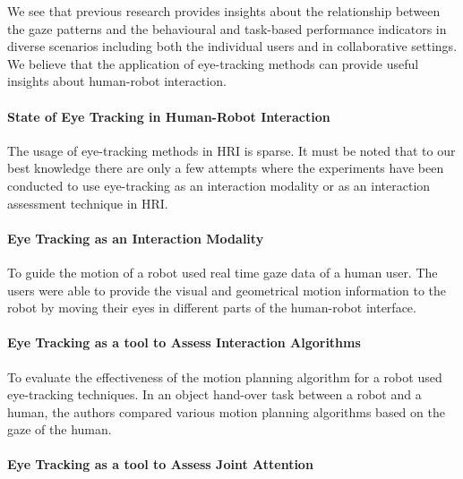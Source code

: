 \documentclass{sig-alternate}
\begin{document}
We see that previous research provides insights about the relationship between the gaze
patterns and the behavioural and task-based performance indicators in diverse
scenarios including both the individual users and in collaborative settings. We believe that the application of eye-tracking methods can provide useful insights about human-robot interaction.



\paragraph{State of Eye Tracking in Human-Robot Interaction}
\label{et_robotics}

The usage of eye-tracking methods in HRI is  sparse. It must be noted that to our best knowledge there are only a few attempts where the experiments have been conducted to use eye-tracking as an interaction modality or as an interaction assessment technique in HRI.

\paragraph{Eye Tracking as an Interaction Modality}

To guide the motion of a robot \cite{bhuiyan2004tracking} used real time  gaze data of a human user. The users were able to provide the visual and geometrical motion information to the robot by moving their eyes in different parts of the human-robot interface.

\paragraph{Eye Tracking as a tool to Assess Interaction Algorithms}

To evaluate the effectiveness of the motion planning algorithm for a robot \cite{dehais2011physiological} used eye-tracking techniques. In an object hand-over task between a robot and a human, the authors compared various motion planning algorithms based on the gaze of the human.

\paragraph{Eye Tracking as a tool to Assess Joint Attention}
\end{document}
